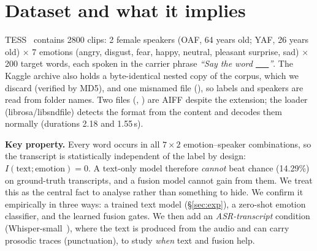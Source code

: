 \section{Dataset and what it implies}
TESS~\cite{tess} contains 2800 clips: 2 female speakers (OAF, 64 years old; YAF, 26 years old) $\times$ 7 emotions (angry, disgust, fear, happy, neutral, pleasant surprise, sad) $\times$ 200 target words, each spoken in the carrier phrase \emph{``Say the word \underline{\ \ \ }''}.
The Kaggle archive also holds a byte-identical nested copy of the corpus, which we discard (verified by MD5), and one misnamed file (), so labels and speakers are read from folder names.
Two files (, ) are AIFF despite the  extension; the loader (librosa/libsndfile) detects the format from the content and decodes them normally (durations 2.18 and 1.55\,s).

\textbf{Key property.} Every word occurs in all $7\times2$ emotion--speaker combinations, so the transcript is statistically independent of the label by design: $I(\text{text};\text{emotion})=0$.
A text-only model therefore \emph{cannot} beat chance (14.29\%) on ground-truth transcripts, and a fusion model cannot gain from them.
We treat this as the central fact to analyse rather than something to hide.
We confirm it empirically in three ways: a trained text model (\S\ref{sec:exp}), a zero-shot emotion classifier, and the learned fusion gates.
We then add an \emph{ASR-transcript} condition (Whisper-small~\cite{whisper}), where the text is produced from the audio and can carry prosodic traces (punctuation), to study \emph{when} text and fusion help.

